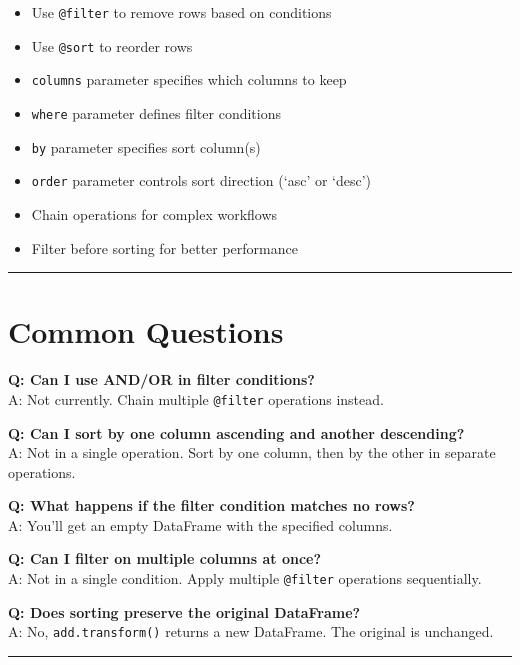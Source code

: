 \documentclass[
  letterpaper,
]{scrbook}
\providecommand{\tightlist}{%
  \setlength{\itemsep}{0pt}\setlength{\parskip}{0pt}}
\begin{document}
\begin{itemize}
\tightlist
\item
  Use \texttt{@filter} to remove rows based on conditions
\item
  Use \texttt{@sort} to reorder rows
\item
  \texttt{columns} parameter specifies which columns to keep
\item
  \texttt{where} parameter defines filter conditions
\item
  \texttt{by} parameter specifies sort column(s)
\item
  \texttt{order} parameter controls sort direction (`asc' or `desc')
\item
  Chain operations for complex workflows
\item
  Filter before sorting for better performance
\end{itemize}

\begin{center}\rule{0.5\linewidth}{0.5pt}\end{center}

\section{Common Questions}\label{common-questions-6}

\textbf{Q: Can I use AND/OR in filter conditions?}\\
A: Not currently. Chain multiple \texttt{@filter} operations instead.

\textbf{Q: Can I sort by one column ascending and another descending?}\\
A: Not in a single operation. Sort by one column, then by the other in
separate operations.

\textbf{Q: What happens if the filter condition matches no rows?}\\
A: You'll get an empty DataFrame with the specified columns.

\textbf{Q: Can I filter on multiple columns at once?}\\
A: Not in a single condition. Apply multiple \texttt{@filter} operations
sequentially.

\textbf{Q: Does sorting preserve the original DataFrame?}\\
A: No, \texttt{add.transform()} returns a new DataFrame. The original is
unchanged.

\begin{center}\rule{0.5\linewidth}{0.5pt}\end{center}
\end{document}
